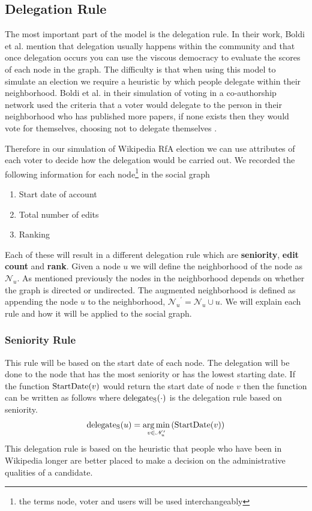 \subsection{Delegation Rule}
The most important part of the model is the delegation rule. In their work, Boldi et al. mention that delegation usually happens within the community and that once delegation occurs you can use the viscous democracy to evaluate the scores of each node in the graph. The difficulty is that when using this model to simulate an election we require a heuristic by which people delegate within their neighborhood. Boldi et al. in their simulation of voting in a co-authorship network used the criteria that a voter would delegate to the person in their neighborhood who has published more papers, if none exists then they would vote for themselves, choosing not to delegate themselves \cite{ViscousDemocracy}.

Therefore in our simulation of Wikipedia RfA election we can use attributes of each voter to decide how the delegation would be carried out. We recorded the following information for each node\footnote{the terms node, voter and users will be used interchangeably} in the social graph
\begin{enumerate}
    \item Start date of account
    \item Total number of edits
    \item Ranking
\end{enumerate}
Each of these will result in a different delegation rule which are \textbf{seniority}, \textbf{edit count} and \textbf{rank}. Given a node $u$ we will define the neighborhood of the node as $\mathcal{N}_u$. As mentioned previously the nodes in the neighborhood depends on whether the graph is directed or undirected. The augmented neighborhood is defined as appending the node $u$ to the neighborhood, ${\mathcal{N}_u}^\prime = \mathcal{N}_u \cup u$. We will explain each rule and how it will be applied to the social graph.

\subsubsection{Seniority Rule}
This rule will be based on the start date of each node. The delegation will be done to the node that has the most seniority or has the lowest starting date. If the function $\operatorname*{StartDate}(v)$ would return the start date of node $v$ then the function can be written as follows where $\operatorname*{delegate_S}(\cdot)$ is the delegation rule based on seniority.
\[\operatorname*{delegate_S}(u)  = \operatorname*{arg\,min}_{v \in \mathcal{N}_u^\prime} \left( \operatorname*{StartDate}(v) \right)\]
This delegation rule is based on the heuristic that people who have been in Wikipedia longer are better placed to make a decision on the administrative qualities of a candidate. 

